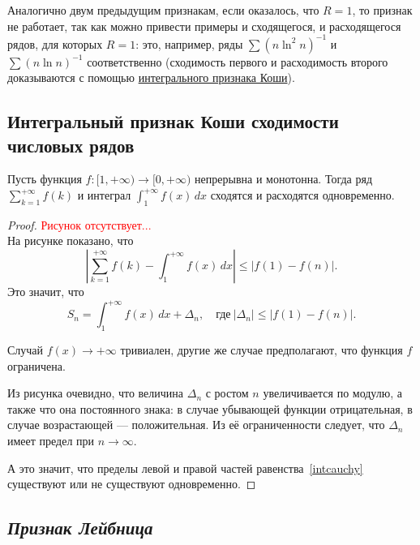 \begin{remark}
	Аналогично двум предыдущим признакам, если оказалось, что \(R = 1\), то признак не работает, так как можно привести примеры и сходящегося, и расходящегося рядов, для которых \(R = 1\): это, например, ряды \(\sum (n \ln^2 n)^{-1}\) и \(\sum (n \ln n)^{-1}\) соответственно (сходимость первого и расходимость второго доказываются с помощью \hyperlink{интегральный признак Коши}{ интегрального признака Коши}).
\end{remark}

\subsection{\color{red} Интегральный признак Коши сходимости числовых рядов}

\begin{theorem} \hypertarget{интегральный признак Коши}{}
	Пусть функция \(f \colon [1, +\infty) \to [0, +\infty)\) непрерывна и монотонна. Тогда ряд \(\displaystyle \sum_{k=1}^{+\infty} f(k)\) и интеграл \(\displaystyle \int_{1}^{+\infty} f(x) \, dx\) сходятся и расходятся одновременно.
\end{theorem}
\begin{proof}
	\textcolor{red}{Рисунок отсутствует...} \\
	На рисунке показано, что \[
	\left|\sum_{k=1}^{+\infty} f(k) - \int_{1}^{+\infty} f(x) \, dx \right| \leqslant |f(1) - f(n)|.
	\]
	Это значит, что
	\begin{equation} \label{intcauchy}
		S_n = \displaystyle \int_{1}^{+\infty} f(x) \, dx + \Delta_n, \quad \text{где} \ |\Delta_n| \leqslant |f(1) - f(n)|.
	\end{equation}
	
	Случай \(f(x) \to +\infty\) тривиален, другие же случае предполагают, что функция \(f\) ограничена.
	
	Из рисунка очевидно, что величина \(\Delta_n\) с ростом \(n\) увеличивается по модулю, а также что она постоянного знака: в случае убывающей функции отрицательная, в случае возрастающей --- положительная. Из её ограниченности следует, что \(\Delta_n\) имеет предел при  \(n \to \infty\).
	
	А это значит, что пределы левой и правой частей равенства~\eqref{intcauchy} существуют или не существуют одновременно.
\end{proof}

\subsection{\color{red} \itshape Признак Лейбница}

